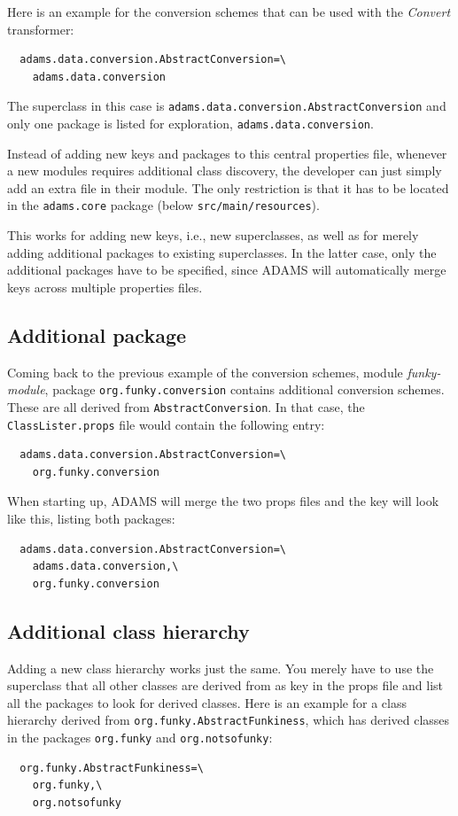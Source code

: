 Here is an example for the conversion schemes that can be used with the
\textit{Convert} transformer:
\begin{verbatim}
  adams.data.conversion.AbstractConversion=\
    adams.data.conversion
\end{verbatim}
The superclass in this case is
\texttt{adams.data.conversion.AbstractConversion} and only one package is listed
for exploration, \texttt{adams.data.conversion}.

Instead of adding new keys and packages to this central properties file,
whenever a new modules requires additional class discovery, the developer can
just simply add an extra file in their module. The only restriction is that it
has to be located in the \texttt{adams.core} package (below
\texttt{src/main/resources}).

This works for adding new keys, i.e., new superclasses, as well as for merely
adding additional packages to existing superclasses. In the latter case, only
the additional packages have to be specified, since ADAMS will automatically
merge keys across multiple properties files.

\subsection{Additional package}
Coming back to the previous example of the conversion schemes, module
\textit{funky-module}, package \texttt{org.funky.conversion} contains
additional conversion schemes. These are all derived from
\texttt{AbstractConversion}. In that case, the \texttt{ClassLister.props} file
would contain the following entry:
\begin{verbatim}
  adams.data.conversion.AbstractConversion=\
    org.funky.conversion
\end{verbatim}
When starting up, ADAMS will merge the two props files and the key
will look like this, listing both packages:
\begin{verbatim}
  adams.data.conversion.AbstractConversion=\
    adams.data.conversion,\
    org.funky.conversion
\end{verbatim}

\subsection{Additional class hierarchy}
Adding a new class hierarchy works just the same. You merely have to use the
superclass that all other classes are derived from as key in the props file and
list all the packages to look for derived classes. Here is an example for a
class hierarchy derived from \texttt{org.funky.AbstractFunkiness}, which has
derived classes in the packages \texttt{org.funky} and \texttt{org.notsofunky}:
\begin{verbatim}
  org.funky.AbstractFunkiness=\
    org.funky,\
    org.notsofunky
\end{verbatim}

